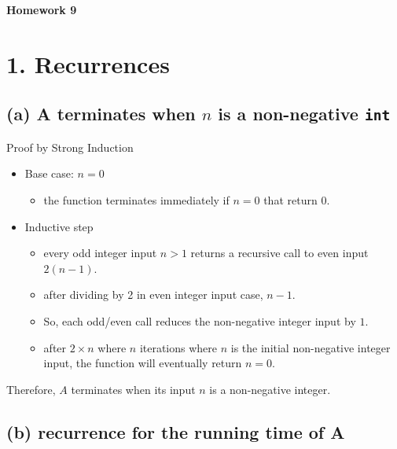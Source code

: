 \documentclass[11pt]{article}
\providecommand{\tightlist}{\setlength{\itemsep}{0pt}\setlength{\parskip}{0pt}}
\begin{document}
\begin{center}
\Large{\textbf{Homework 9}}
\end{center}

\hypertarget{recurrences}{%
\section{1. Recurrences}\label{recurrences}}

\hypertarget{a-a-terminates-when-n-is-a-non-negative-int}{%
\subsection{\texorpdfstring{(a) A terminates when \(n\) is a
non-negative
\texttt{int}}{(a) A terminates when n is a non-negative int}}\label{a-a-terminates-when-n-is-a-non-negative-int}}

Proof by Strong Induction

\begin{itemize}
\tightlist
\item
  Base case: \(n=0\)

  \begin{itemize}
  \tightlist
  \item
    the function terminates immediately if \(n=0\) that return \(0\).
  \end{itemize}
\item
  Inductive step

  \begin{itemize}
  \tightlist
  \item
    every odd integer input \(n>1\) returns a recursive call to even
    input \(2(n-1)\).
  \item
    after dividing by 2 in even integer input case, \(n-1\).
  \item
    So, each odd/even call reduces the non-negative integer input by
    \(1\).
  \item
    after \(2 \times n\) where \(n\) iterations where \(n\) is the
    initial non-negative integer input, the function will eventually
    return \(n=0\).
  \end{itemize}
\end{itemize}

Therefore, \(A\) terminates when its input \(n\) is a non-negative
integer.

\hypertarget{b-recurrence-for-the-running-time-of-a}{%
\subsection{(b) recurrence for the running time of
A}\label{b-recurrence-for-the-running-time-of-a}}
\end{document}
